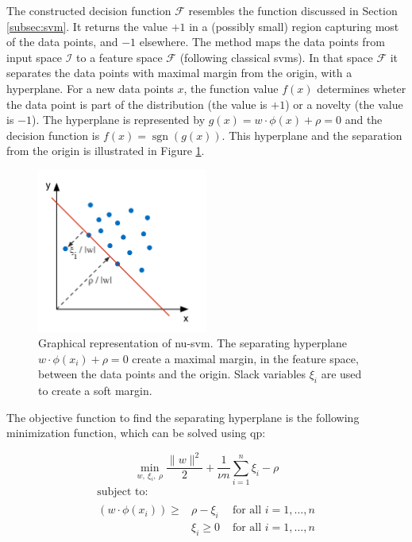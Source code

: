 The constructed decision function $\mathcal{F}$ resembles the function discussed in Section \ref{subsec:svm}.
It returns the value $+1$ in a (possibly small) region capturing most of the data points, and $-1$ elsewhere.
The method maps the data points from input space $\mathcal{I}$ to a feature space $\mathcal{F}$ (following classical \glspl{svm}).
In that space $\mathcal{F}$ it separates the data points with maximal margin from the origin, with a hyperplane.
For a new data points $x$, the function value $f(x)$ determines wheter the data point is part of the distribution (\ie the value is $+1$) or a novelty (\ie the value is $-1$).
The hyperplane is represented by $g(x) = w \cdot \phi(x) + \rho = 0$ and the decision function is $f(x) = \operatorname{sgn}(g(x))$.
This hyperplane and the separation from the origin is illustrated in Figure \ref{fig:nu-svm}.

\begin{figure}
  \centering
    \includegraphics[width=0.5\textwidth,keepaspectratio]{./Figures/chapter3/nu-svm.pdf}
  \caption[\gls{nu-svm}]{Graphical representation of \gls{nu-svm}. The separating hyperplane $w \cdot \phi(x_i) + \rho = 0$ create a maximal margin, in the feature space, between the data points and the origin. Slack variables $\xi_i$ are used to create a soft margin.}
  \label{fig:nu-svm}
\end{figure}

The objective function to find the separating hyperplane is the following minimization function, which can be solved using \gls{qp}:

\begin{equation}\label{eq:nu-svm_objective}
  \operatorname*{min}_{w,\ \xi_i,\ \rho } \frac{\lVert w \rVert ^2}{2} + \frac{1}{\nu n} \sum_{i=1}^n \xi_i - \rho
\end{equation}
\begin{equation}
  \begin{multlined}
    \mbox{ subject to: } \\
    \begin{aligned}
      (w \cdot \phi(x_i)) \geq & \rho - \xi_i & \mbox{ for all } i = 1, \dots, n \\
      & \xi_i \geq 0 & \mbox{ for all } i = 1, \dots, n \\
    \end{aligned}
  \end{multlined}
\end{equation}

